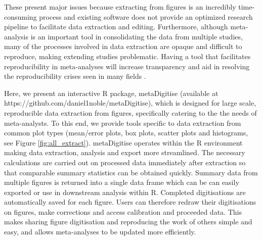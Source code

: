 \documentclass[12pt]{article}
\newcommand{\pkg}[1]{{\fontseries{b}\selectfont #1}}
\let\proglang=\textsf
\begin{document}
These present major issues because extracting from figures is an incredibly time-consuming process and existing software does not provide an optimized research pipeline to facilitate data extraction and editing. Furthermore, although meta-analysis is an important tool in consolidating the data from multiple studies, many of the processes involved in data extraction are opaque and difficult to reproduce, making extending studies problematic. Having a tool that facilitates reproducibility in meta-analyses will increase transparency and aid in resolving the reproducibility crises seen in many fields \citep{peng_reproducible_2006, peng_reproducible_2011, sandve_ten_2013, Parker2016,Ihle2017}.

Here, we present an interactive \proglang{R} package, \pkg{metaDigitise} (available at https://github.com/daniel1noble/metaDigitise), which is designed for large scale, reproducible data extraction from figures, specifically catering to the the needs of meta-analysts. To this end, we provide tools specific to data extraction from common plot types (mean/error plots, box plots, scatter plots and histograms, see Figure \ref{fig:all_extract}). \pkg{metaDigitise} operates within the \proglang{R} environment making data extraction, analysis and export more streamlined. The necessary calculations are carried out on processed data immediately after extraction so that comparable summary statistics can be obtained quickly. Summary data from multiple figures is returned into a single data frame which can be can easily exported or use in downstream analysis within \proglang{R}. Completed digitisations are automatically saved for each figure. Users can therefore redraw their digitisations on figures, make corrections and access calibration and proceeded data. This makes sharing figure digitisation and reproducing the work of others simple and easy, and allows meta-analyses to be updated more efficiently.



\end{document}
